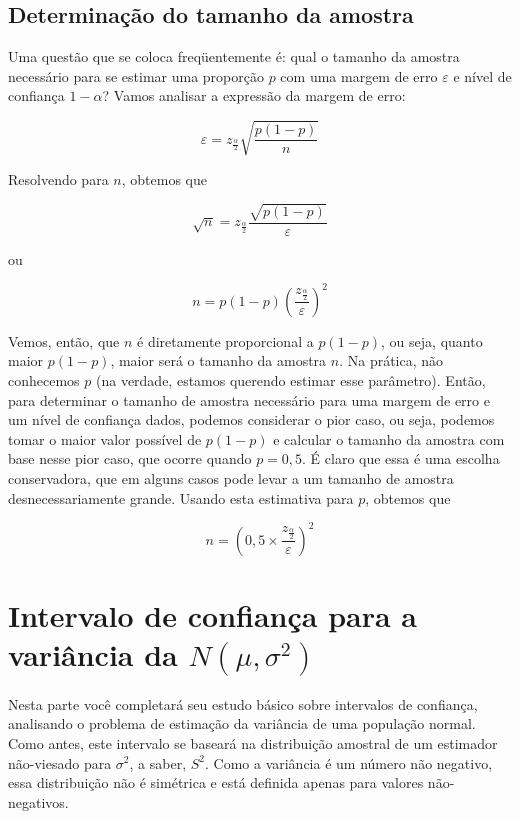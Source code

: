 \documentclass[
]{book}
\begin{document}
\hypertarget{determinauxe7uxe3o-do-tamanho-da-amostra}{%
\subsection{Determinação do tamanho da amostra}\label{determinauxe7uxe3o-do-tamanho-da-amostra}}

Uma questão que se coloca freqüentemente é: qual o tamanho da amostra necessário para se estimar uma proporção \(p\) com uma margem de erro \(\varepsilon\) e nível de confiança \(1-\alpha\)? Vamos analisar a expressão da margem de erro:

\[\varepsilon=z_{\frac{\alpha}{2}}\sqrt{\frac{p(1-p)}{n}}\]

Resolvendo para \(n\), obtemos que

\[\sqrt{n}=z_{\frac{\alpha}{2}}\frac{\sqrt{p(1-p)}}{\varepsilon}\]

ou

\[n=p(1-p)\left(\frac{z_{\frac{\alpha}{2}}}{\varepsilon}\right)^2\]

Vemos, então, que \(n\) é diretamente proporcional a \(p(1-p)\), ou seja, quanto maior \(p(1-p)\), maior será o tamanho da amostra \(n\). Na prática, não conhecemos \(p\) (na verdade, estamos querendo estimar esse parâmetro). Então, para determinar o tamanho de amostra necessário para uma margem de erro e um nível de confiança dados, podemos considerar o pior caso, ou seja, podemos tomar o maior valor possível de \(p(1 - p)\) e calcular o tamanho da amostra com base nesse pior caso, que ocorre quando \(p = 0,5\). É claro que essa é uma escolha conservadora, que em alguns casos pode levar a um tamanho de amostra desnecessariamente grande. Usando esta estimativa para \(p\), obtemos que

\[n=\left(0,5\times \frac{z_{\frac{\alpha}{2}}}{\varepsilon}\right)^2\]

\hypertarget{intervalo-de-confianuxe7a-para-a-variuxe2ncia-da-nmusigma2}{%
\section{\texorpdfstring{Intervalo de confiança para a variância da \(N(\mu,\sigma^2)\)}{Intervalo de confiança para a variância da N(\textbackslash mu,\textbackslash sigma\^{}2)}}\label{intervalo-de-confianuxe7a-para-a-variuxe2ncia-da-nmusigma2}}

Nesta parte você completará seu estudo básico sobre intervalos de confiança, analisando o problema de estimação da variância de uma população normal. Como antes, este intervalo se baseará na distribuição amostral de um estimador não-viesado para \(\sigma^2\), a saber, \(S^2\). Como a variância é um número não negativo, essa distribuição não é simétrica e está definida apenas para valores não-negativos.
\end{document}
